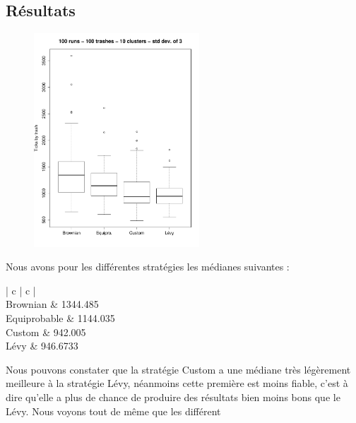 \subsection{Résultats}


\begin{figure}[H]
	\begin{center}
		\includegraphics[height=8cm]{diagrams/100Tr10Clts_all.pdf}
		\caption{}
		\label{fig:100Trashes_10Clusters}
	\end{center}
\end{figure}

Nous avons pour les différentes stratégies les médianes suivantes :

\begin{tabular}{ | c | c | }
	\hline
	 \\
	\hline
	Brownian & 1344.485 \\
	Equiprobable & 1144.035 \\
	Custom & 942.005 \\
	Lévy & 946.6733 \\
	\hline
\end{tabular}

Nous pouvons constater que la stratégie Custom a une médiane très légèrement meilleure à la stratégie Lévy, néanmoins cette première est moins fiable, c'est à dire qu'elle a plus de chance de produire des résultats bien moins bons que le Lévy.
Nous voyons tout de même que les différent
